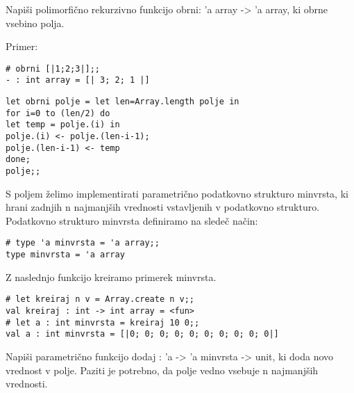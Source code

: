 \begin{ex} 
Napi\v si polimorfi\v cno rekurzivno funkcijo obrni: 'a array -> 'a array, ki obrne vsebino polja.

Primer: 
\begin{verbatim}
# obrni [|1;2;3|];;
- : int array = [| 3; 2; 1 |]
\end{verbatim}

\begin{sol}
\begin{verbatim}
let obrni polje = let len=Array.length polje in
for i=0 to (len/2) do 
let temp = polje.(i) in
polje.(i) <- polje.(len-i-1);
polje.(len-i-1) <- temp 
done;
polje;;
\end{verbatim}
\end{sol}

\end{ex}
\begin{ex}
S poljem \v zelimo implementirati parametri\v cno podatkovno strukturo minvrsta, ki hrani zadnjih n najmanj\v sih vrednosti vstavljenih v podatkovno strukturo. Podatkovno strukturo minvrsta definiramo na slede\v c na\v cin:

\begin{verbatim}
# type 'a minvrsta = 'a array;; 
type minvrsta = 'a array 
\end{verbatim}
Z naslednjo funkcijo kreiramo primerek minvrsta.

\begin{verbatim}
# let kreiraj n v = Array.create n v;;   
val kreiraj : int -> int array = <fun> 
# let a : int minvrsta = kreiraj 10 0;; 
val a : int minvrsta = [|0; 0; 0; 0; 0; 0; 0; 0; 0; 0|] 
\end{verbatim}
Napi\v si parametri\v cno funkcijo dodaj : 'a -> 'a minvrsta -> unit, ki doda novo vrednost v polje. Paziti je potrebno, da polje vedno vsebuje n najmanj\v sih vrednosti.
\end{ex}

